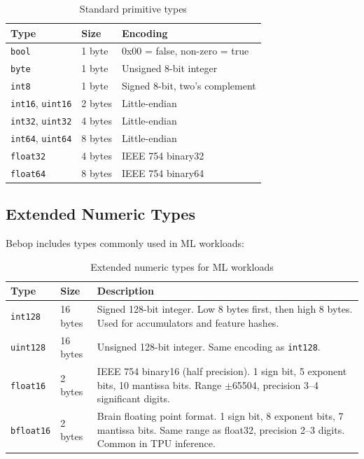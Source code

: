 \documentclass[10pt,onecolumn]{article}
\begin{document}
\begin{table}[ht]
\centering
\begin{tabular}{@{}lll@{}}
\toprule
\textbf{Type} & \textbf{Size} & \textbf{Encoding} \\
\midrule
\texttt{bool} & 1 byte & 0x00 = false, non-zero = true \\
\texttt{byte} & 1 byte & Unsigned 8-bit integer \\
\texttt{int8} & 1 byte & Signed 8-bit, two's complement \\
\texttt{int16}, \texttt{uint16} & 2 bytes & Little-endian \\
\texttt{int32}, \texttt{uint32} & 4 bytes & Little-endian \\
\texttt{int64}, \texttt{uint64} & 8 bytes & Little-endian \\
\texttt{float32} & 4 bytes & IEEE 754 binary32 \\
\texttt{float64} & 8 bytes & IEEE 754 binary64 \\
\bottomrule
\end{tabular}
\caption{Standard primitive types}
\label{tab:primitives}
\end{table}

\subsection{Extended Numeric Types}

Bebop includes types commonly used in ML workloads:

\begin{table}[ht]
\centering
\begin{tabular}{@{}llp{3.5in}@{}}
\toprule
\textbf{Type} & \textbf{Size} & \textbf{Description} \\
\midrule
\texttt{int128} & 16 bytes & Signed 128-bit integer. Low 8 bytes first, then high 8 bytes. Used for accumulators and feature hashes. \\[6pt]
\texttt{uint128} & 16 bytes & Unsigned 128-bit integer. Same encoding as \texttt{int128}. \\[6pt]
\texttt{float16} & 2 bytes & IEEE 754 binary16 (half precision). 1 sign bit, 5 exponent bits, 10 mantissa bits. Range $\pm$65504, precision 3--4 significant digits. \\[6pt]
\texttt{bfloat16} & 2 bytes & Brain floating point format. 1 sign bit, 8 exponent bits, 7 mantissa bits. Same range as float32, precision 2--3 digits. Common in TPU inference. \\
\bottomrule
\end{tabular}
\caption{Extended numeric types for ML workloads}
\label{tab:extended-types}
\end{table}
\end{document}
